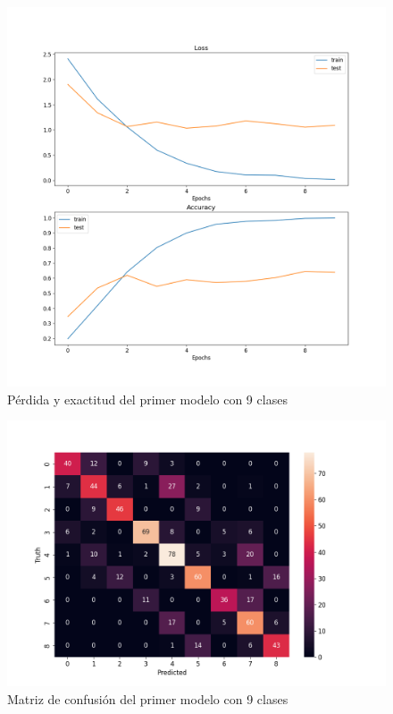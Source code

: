\begin{figure}[H]
	\centering
	\includegraphics[scale=0.65]{figures/LA0.png}
	\caption{Pérdida y exactitud del primer modelo con 9 clases}
	\label{fig:img9}
\end{figure}

\begin{figure}[H]
	\centering
	\includegraphics[scale=0.75]{figures/CM0.png}
	\caption{Matriz de confusión del primer modelo con 9 clases}
	\label{fig:img10}
\end{figure}

